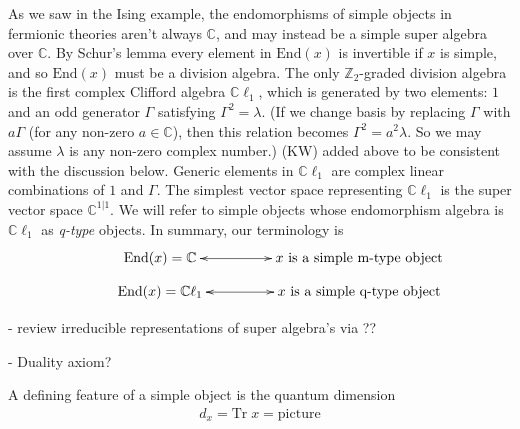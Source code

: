 \documentclass[12pt,a4paper]{article}
\newcommand{\zz}{\mathbb{Z}}
\newcommand{\cc}{\mathbb{C}}
\newcommand{\End}{\text{End}}
\newcommand{\cl}{\mathbb{C}\ell}
\newcommand{\kw}[1]{{\color{kwcolor}\footnotesize{(KW) #1}}}
\begin{document}
As we saw in the Ising example, the endomorphisms of simple objects in fermionic theories aren't always $\mathbb{C}$, and may instead be a simple super algebra over $\mathbb{C}$. 
By Schur's lemma every element in $\End(x)$ is invertible if $x$ is simple, and so $\End(x)$ must be a division algebra. 
The only $\zz_2$-graded division algebra is the first complex Clifford algebra $\cl_1$, 
which is generated by two elements: $1$ and an odd generator $\Gamma$ satisfying $\Gamma^2 = \lambda$. 
(If we change basis by replacing $\Gamma$ with $a \Gamma$ (for any non-zero $a\in \cc$), then this relation becomes
$\Gamma^2 = a^2\lambda$.
So we may assume $\lambda$ is any non-zero complex number.)
\kw{added above to be consistent with the discussion below.}
Generic elements in $\cl_1$ are complex linear combinations of $1$ and $\Gamma$.
The simplest vector space representing $\cl_1$ is the super vector space $\mathbb{C}^{1|1}$.
We will refer to simple objects whose endomorphism algebra is $\cl_1$ as {\it q-type} objects.
In summary, our terminology is 
\begin{align}
\vcenter{\xymatrix @!0 @M=1mm @C=25mm{
& \text{End}(x) = \mathbb{C} \ar@{<->}[rr] &   &\text{$x$ is a simple m-type object}&  \\
&\text{End}(x) = \mathbb{C} \ell_1 \ar@{<->}[rr]  &  &\text{$x$ is a simple q-type object}&
	}}
\end{align}

$$
$$
- review irreducible representations of super algebra's via \cite{jozefiak1988}??

- Duality axiom?
$$
$$



A defining feature of a simple object is the quantum dimension
\begin{align}
d_x = \text{Tr} \; x = \text{picture}
\end{align}
\end{document}
